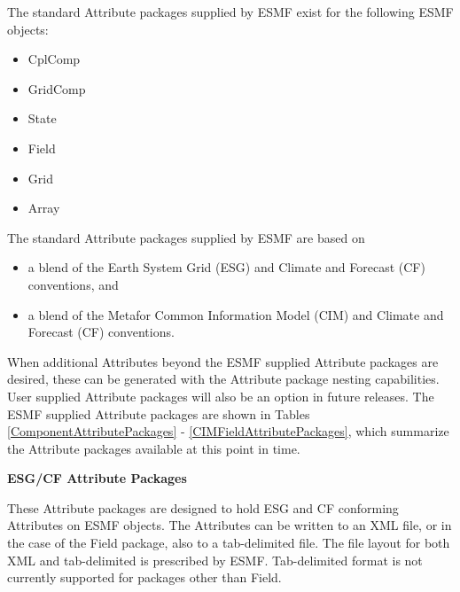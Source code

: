 The standard Attribute packages supplied by ESMF exist for the following ESMF objects:

\begin{itemize}
\item CplComp
\item GridComp
\item State
\item Field
\item Grid
\item Array
\end{itemize}

The standard Attribute packages supplied by ESMF are based on 

\begin{itemize}
\item a blend of the Earth System Grid (ESG) and Climate and Forecast (CF) conventions, and
\item a blend of the Metafor Common Information Model (CIM) and Climate and Forecast (CF) conventions.
\end{itemize}

When additional Attributes beyond the ESMF supplied Attribute packages are desired, these can be generated with the Attribute package nesting capabilities.  User supplied Attribute packages will also be an option in future releases.  The ESMF supplied Attribute packages are shown in Tables \ref{ComponentAttributePackages} - \ref{CIMFieldAttributePackages}, which summarize the Attribute packages available at this point in time.

\vspace{18pt}

{\bf \large ESG/CF Attribute Packages}

These Attribute packages are designed to hold ESG and CF conforming Attributes on ESMF objects. The Attributes can be written to an XML file, or in the case of the Field package, also to a tab-delimited file.  The file layout for both XML and tab-delimited is prescribed by ESMF.  Tab-delimited format is not currently supported for packages other than Field.

\vspace{8pt}

